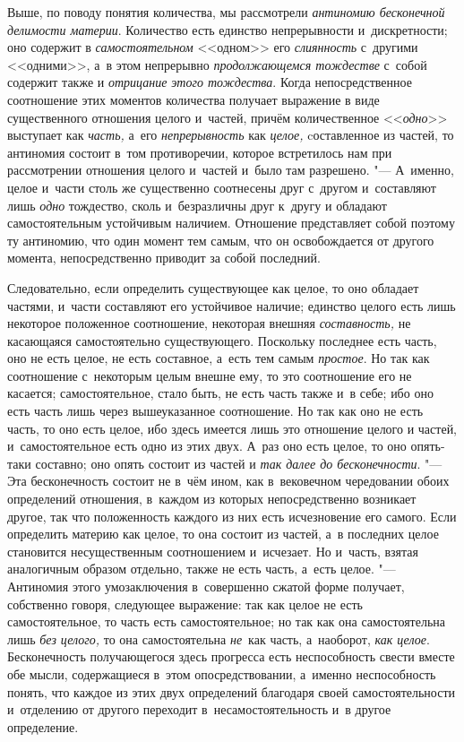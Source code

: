 
Выше, по поводу понятия количества, мы рассмотрели
{\em антиномию бесконечной делимости материи}.
Количество есть единство непрерывности и~дискретности; оно содержит в
{\em самостоятельном} <<одном>> его
{\em слиянность} с~другими <<одними>>, а~в этом
непрерывно {\em продолжающемся тождестве} с~собой
содержит также и {\em отрицание этого тождества}. Когда
непосредственное соотношение этих моментов количества получает выражение в
виде существенного отношения целого и~частей, причём количественное
<<{\em одно}>> выступает как {\em часть,} а~его
{\em непрерывность} как {\em целое,} cоставленное из частей, то антиномия
состоит в~том противоречии, которое встретилось нам при рассмотрении
отношения целого и~частей и~было там разрешено. "--- А~именно, целое и~части
столь же существенно соотнесены друг с~другом и~составляют лишь
{\em одно} тождество, сколь и~безразличны друг к~другу
и обладают самостоятельным устойчивым наличием. Отношение представляет
собой поэтому ту антиномию, что один момент тем самым, что он освобождается
от другого момента, непосредственно приводит за собой последний.

Следовательно, если определить существующее как целое, то оно обладает
частями, и~части составляют его устойчивое наличие; единство целого есть
лишь некоторое положенное соотношение, некоторая внешняя
{\em составность,} не касающаяся самостоятельно
существующего. Поскольку последнее есть часть, оно не есть целое, не есть
составное, а~есть тем самым {\em простое}. Но так как
соотношение с~некоторым целым внешне ему, то это соотношение его не
касается; самостоятельное, стало быть, не есть часть также и~в себе; ибо
оно есть часть лишь через вышеуказанное соотношение. Но так как оно не есть
часть, то оно есть целое, ибо здесь имеется лишь это отношение целого и
частей, и~самостоятельное есть одно из этих двух. А~раз оно есть целое,
то оно опять-таки составно; оно опять состоит из частей и
{\em так далее до бесконечности}. "--- Эта бесконечность
состоит не в~чём ином, как в~вековечном чередовании обоих определений
отношения, в~каждом из которых непосредственно возникает другое, так что
положенность каждого из них есть исчезновение его самого. Если определить
материю как целое, то она состоит из частей, а~в последних целое становится
несущественным соотношением и~исчезает. Но и~часть, взятая аналогичным
образом отдельно, также не есть часть, а~есть целое. "--- Антиномия этого
умозаключения в~совершенно сжатой форме получает, собственно говоря,
следующее выражение: так как целое не есть самостоятельное, то часть есть
самостоятельное; но так как она самостоятельна лишь
{\em без целого,} то она самостоятельна
{\em не}~как часть, а~наоборот,
{\em как целое}. Бесконечность получающегося здесь
прогресса есть неспособность свести вместе обе мысли, содержащиеся в~этом
опосредствовании, а~именно неспособность понять, что каждое из этих двух
определений благодаря своей самостоятельности и~отделению от другого
переходит в~несамостоятельность и~в другое определение.


